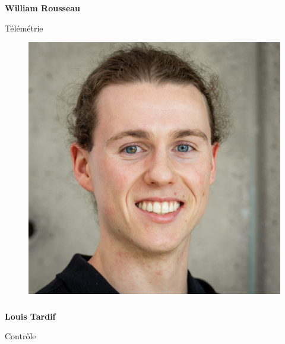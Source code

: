 \documentclass[a0paper,portrait]{baposter}
\begin{document}
\begin{poster}
{\subsubsection*{}
\vspace{2mm}
\textbf{William Rousseau}


Télémétrie
\begin{figure}
\includegraphics[width=.9\linewidth]{img/membres/Louis-Tardif-3.jpg} 
\end{figure}
\subsubsection*{}
\vspace{2mm}
\textbf{Louis Tardif}


Contrôle
\vspace{1cm}
%
%
%
%
%
%
}



\end{poster}
\end{document}
